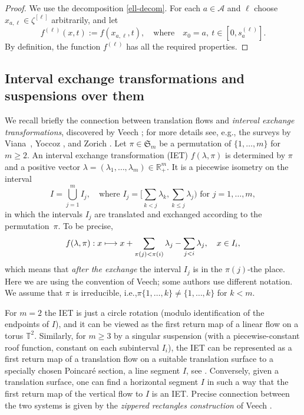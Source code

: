\documentclass[11pt]{article}
\newcommand{\ie}{i.e.,\xspace}
\numberwithin{equation}{section}\newcommand{\Relation}[2][]{}\newtheorem*{prop*}{Proposition}
\let\mathcal\mathscr
\def\mto{\mathchoice{\longmapsto}{\mapsto}{\mapsto}{\mapsto}}
\newcommand{\sep}{:}
\theoremstyle{plain}
\theoremstyle{definition}
\let\lam\lambda
\newcommand\Frs{\mathfrak{S}}
\newcommand\Ak{\mathcal{A}}
\newcommand{\R}{\mathbb{R}}
\newcommand\T{\mathbb{T}}
\begin{document}
\begin{proof}
We use the decomposition \eqref{ell-decom}. For each $a\in \Ak$ and $\ell$ choose $x_{a,\ell}\in \zeta^{[\ell]}$ arbitrarily, and let
\[
f^{(\ell)}(x,t):= f(x_{a,\ell},t),\quad \text{where}\quad x_0=a,\ t\in [0, s_a^{(\ell)}].
\]
By definition, the function $f^{(\ell)}$ has all the required properties.
\end{proof}

\subsection{Interval exchange transformations and suspensions over them} \label{subsec-IET}

We recall briefly the connection between translation flows and \emph{interval exchange transformations}, discovered by Veech \cite{Veech0,
veech}; for more details see, e.g., the surveys by Viana~\cite{viana2}, Yoccoz \cite{yoccoz}, and Zorich \cite{Zorich1}. Let $\pi\in \Frs_m$ be a permutation of $\{1,\ldots,m\}$ for $m\ge 2$.
An interval exchange transformation (IET) $f(\lam,\pi)$ is determined by $\pi$ and a positive vector $\lam = (\lam_1,\ldots,\lam_m)\in \R^m_+$. It is a piecewise isometry on the interval
\[
I = \bigcup_{j=1}^m I_j,\quad \text{where }I_j = \textstyle\bigl[\sum_{k<j}\lam_k, \sum_{k\le j} \lam_j\bigr)\text{ for }j=1,\ldots,m,
\]
in which the intervals $I_j$ are translated and exchanged according to the permutation~$\pi$.
To be precise,
\[
f(\lam,\pi)\sep x\mto x + \sum_{\pi(j) < \pi(i)} \lam_j - \sum_{j < i} \lam_j,\quad x\in I_i,
\]
which means that \emph{after the exchange} the interval $I_j$ is in the $\pi(j)$-the place. Here we are using the convention of Veech; some authors use different notation.
We assume that $\pi$ is irreducible, \ie $\pi\{1,\ldots,k\}\ne \{1,\ldots,k\}$ for $k<m$.

For $m=2$ the IET is just a circle rotation (modulo identification of the endpoints of $I$), and it can be viewed as the first return map of a linear flow on a torus $\T^2$. Similarly, for $m\ge 3$ by a singular suspension (with a piecewise-constant roof function, constant on each subinterval $I_i$), the IET can be represented as a first return map of a translation flow on a suitable translation surface to a specially chosen Poincaré section, a line segment $I$, see \cite{Veech0,veech}. Conversely,
given a translation surface, one can find a horizontal segment $I$ in such a way that the first return map of the vertical flow to $I$ is an IET. Precise connection between the two systems is given by the \emph{zippered rectangles construction} of Veech \cite{veech}.
\end{document}
